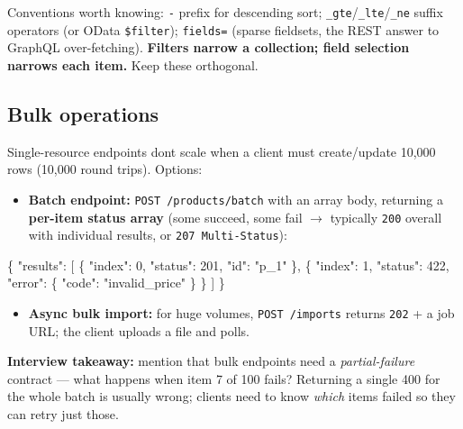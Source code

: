 \documentclass[11pt]{article}
\providecommand{\tightlist}{\setlength{\itemsep}{1pt}\setlength{\parskip}{0pt}}
\newenvironment{Shaded}{\begin{snugshade}}{\end{snugshade}}
\newcommand{\DataTypeTok}[1]{\textcolor[rgb]{0.16,0.50,0.73}{#1}}
\newcommand{\DecValTok}[1]{\textcolor[rgb]{0.96,0.45,0.00}{#1}}
\newcommand{\FunctionTok}[1]{\textcolor[rgb]{0.56,0.27,0.68}{#1}}
\newcommand{\OtherTok}[1]{\textcolor[rgb]{0.15,0.68,0.38}{#1}}
\newcommand{\StringTok}[1]{\textcolor[rgb]{0.96,0.31,0.31}{#1}}
\begin{document}
Conventions worth knowing: \texttt{-} prefix for descending sort; \texttt{\_gte}/\texttt{\_lte}/\texttt{\_ne} suffix operators (or OData \texttt{\$filter}); \texttt{fields=} (sparse fieldsets, the REST answer to GraphQL over-fetching). \textbf{Filters narrow a collection; field selection narrows each item.} Keep these orthogonal.

\subsection{Bulk operations}\label{bulk-operations}

Single-resource endpoints don\textquotesingle t scale when a client must create/update 10,000 rows (10,000 round trips). Options:

\begin{itemize}
\tightlist
\item
  \textbf{Batch endpoint:} \texttt{POST\ /products/batch} with an array body, returning a \textbf{per-item status array} (some succeed, some fail \(\rightarrow\) typically \texttt{200} overall with individual results, or \texttt{207\ Multi-Status}):
\end{itemize}


\begin{Shaded}
\begin{Highlighting}[]
\FunctionTok{\{}
  \DataTypeTok{"results"}\FunctionTok{:} \OtherTok{[}
    \FunctionTok{\{} \DataTypeTok{"index"}\FunctionTok{:} \DecValTok{0}\FunctionTok{,} \DataTypeTok{"status"}\FunctionTok{:} \DecValTok{201}\FunctionTok{,} \DataTypeTok{"id"}\FunctionTok{:} \StringTok{"p\_1"} \FunctionTok{\}}\OtherTok{,}
    \FunctionTok{\{} \DataTypeTok{"index"}\FunctionTok{:} \DecValTok{1}\FunctionTok{,} \DataTypeTok{"status"}\FunctionTok{:} \DecValTok{422}\FunctionTok{,} \DataTypeTok{"error"}\FunctionTok{:} \FunctionTok{\{} \DataTypeTok{"code"}\FunctionTok{:} \StringTok{"invalid\_price"} \FunctionTok{\}} \FunctionTok{\}}
  \OtherTok{]}
\FunctionTok{\}}
\end{Highlighting}
\end{Shaded}

\begin{itemize}
\tightlist
\item
  \textbf{Async bulk import:} for huge volumes, \texttt{POST\ /imports} returns \texttt{202} + a job URL; the client uploads a file and polls.
\end{itemize}

\textbf{Interview takeaway:} mention that bulk endpoints need a \emph{partial-failure} contract --- what happens when item 7 of 100 fails? Returning a single 400 for the whole batch is usually wrong; clients need to know \emph{which} items failed so they can retry just those.
\end{document}
